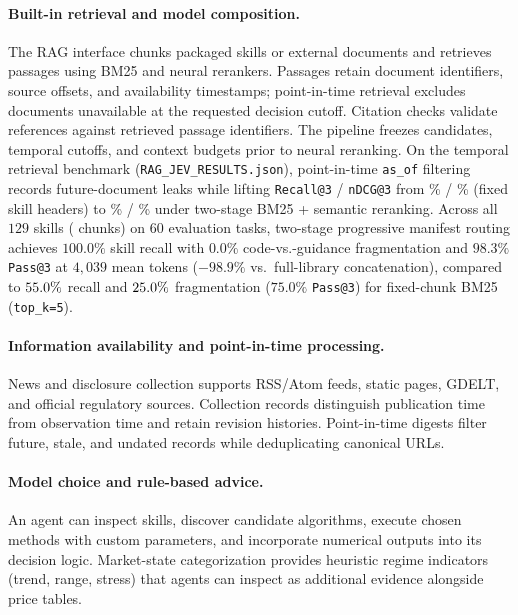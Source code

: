 \paragraph{Built-in retrieval and model composition.}
The RAG interface chunks packaged skills or external documents and retrieves passages
using BM25 and neural rerankers. Passages retain document identifiers, source offsets,
and availability timestamps; point-in-time retrieval excludes documents unavailable at
the requested decision cutoff. Citation checks validate references against retrieved
passage identifiers. The pipeline freezes candidates, temporal cutoffs, and context
budgets prior to neural reranking. On the temporal retrieval benchmark (\texttt{RAG\_JEV\_RESULTS.json}),
point-in-time \texttt{as\_of} filtering records \RAGJevFutureLeaks{} future-document leaks while lifting
\texttt{Recall@3} / \texttt{nDCG@3} from \RAGJevFixedRecall\% / \RAGJevFixedNDCG\% (fixed skill headers)
to \RAGJevDevRecall\% / \RAGJevDevNDCG\% under two-stage BM25 + semantic reranking. Across all $129$ skills
(\RAGIndexedChunks{} chunks) on $60$ evaluation tasks, two-stage progressive manifest routing achieves
$100.0\%$ skill recall with $0.0\%$ code-vs.-guidance fragmentation and $98.3\%$ \texttt{Pass@3} at
$4{,}039$ mean tokens ($-98.9\%$ vs.\ full-library concatenation), compared to $55.0\%$ recall
and $25.0\%$ fragmentation ($75.0\%$ \texttt{Pass@3}) for fixed-chunk BM25 (\texttt{top\_k=5}).

\paragraph{Information availability and point-in-time processing.}
News and disclosure collection supports RSS/Atom feeds, static pages, GDELT, and official
regulatory sources. Collection records distinguish publication time from observation
time and retain revision histories. Point-in-time digests filter future, stale, and
undated records while deduplicating canonical URLs.

\paragraph{Model choice and rule-based advice.}
An agent can inspect skills, discover candidate algorithms, execute chosen methods with
custom parameters, and incorporate numerical outputs into its decision logic.
Market-state categorization provides heuristic regime indicators (trend, range,
stress) that agents can inspect as additional evidence alongside price tables.

